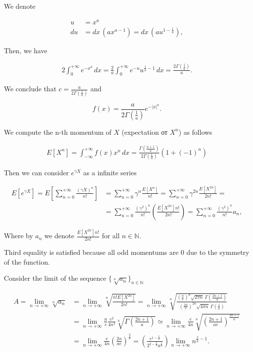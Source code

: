 \documentclass[12pt, a4paper]{article}
\theoremstyle{remark}
\newcommand{\expx}[1]{e^{-|x|^{#1}}}
\newcommand{\expxpoz}[1]{e^{-x^{#1}}}
\newcommand{\infint}[1]{\int_{-\infty}^{+\infty} #1 \, dx}
\newcommand{\infintpoz}[1]{\int_{0}^{+\infty} #1 \, dx}
\begin{document}
We denote

\begin{align*}
    u  & = x^a                                              \\
    du & = dx\,(a x^{a - 1}) = dx\,(a u^{1 - \frac{1}{a}}),
\end{align*}

Then, we have

\begin{align*}
    2\infintpoz{\expxpoz{a}} = \frac{2}{a} \infintpoz{e^{-u}u^{\frac{1}{a} - 1}} = \frac{2\Gamma(\frac{1}{a})}{a}.
\end{align*}

We conclude that $c = \frac{a}{2\Gamma(\frac{1}{a})}
$ and

$$f(x) = \frac{a}{2\Gamma(\frac{1}{a})} \expx{a}.$$

We compute the n-th momentum of $X$ (expectation от $X^n$) as follows

\begin{align*}
    E[X^n] = \infint{f(x) x^n} = \frac{\Gamma(\frac{n + 1}{a})}{2\Gamma(\frac{1}{a})} (1 + (-1)^n)
\end{align*}

Then we can consider $e^{\gamma X}$ as a infinite series

\begin{align*}
    E[e^{\gamma X}] = E\left[\sum_{n = 0}^{+\infty}\frac{(\gamma X)^n}{n!}\right] & = \sum_{n = 0}^{+\infty}\gamma^n\frac{E[X^n]}{n!} = \sum_{n = 0}^{+\infty}\gamma^{2n}\frac{E[X^{2n}]}{2n!} =                                \\
    & = \sum_{n = 0}^{+\infty}\frac{(\gamma^2)^{n}}{n!}\left(\frac{E[X^{2n}]n!}{2n!}\right) = \sum_{n = 0}^{+\infty}\frac{(\gamma^2)^{n}}{n!} a_n,
\end{align*}

Where by $a_n$ we denote $\frac{E[X^{2n}]n!}{2n!}$ for all $n \in \mathbb{N}$.

Third equality is satisfied because all odd momentums are 0 due to the symmetry of the function.

Consider the limit of the sequence $\{\sqrt[n]{a_n}\}_{n \in \mathbb{N}}$

\begin{align*}
    A = \lim_{n \to +\infty} \sqrt[n]{a_n} & = \lim_{n \to +\infty} \sqrt[n]{\frac{n! E[X^{2n}]}{2n!}} =
    \lim_{n \to +\infty} \sqrt[n]{
        \frac{
            \left(\frac{n}{e}\right)^n \sqrt{2\pi n} \
            \Gamma\left(\frac{2n + 1}{a}\right)}{
            \left(\frac{2n}{e}\right)^{2n} \sqrt{4\pi n}\ \Gamma\left(\frac{1}{a}\right)}
    } \\
    & = \lim_{n \to +\infty} \frac{n}{e} \frac{e^2}{4n^2} \sqrt[n]{\Gamma\left(\frac{2n + 1}{a}\right)} \simeq \lim_{n \to +\infty}  \frac{e}{4n} \sqrt[n]{\left(\frac{2n + 1}{ae}\right)^{\frac{2n + 1}{a}}} \\
    & = \lim_{n \to +\infty} \frac{e}{4n} \left(\frac{2n}{ae}\right)^{\frac{2}{a}} = \left(\frac{e^{1 - \frac{2}{a}}}{2^{2 - \frac{2}{a}} a^\frac{2}{a}}\right) \lim_{n \to +\infty} n^{\frac{2}{a} - 1}.
\end{align*}
\end{document}
